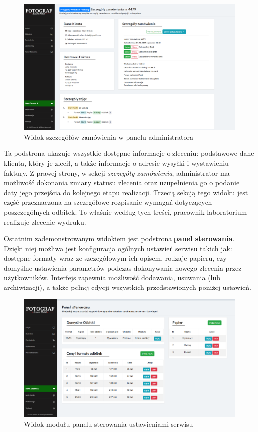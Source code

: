 \begin{figure}[ht]
	\centering
	\includegraphics[width=0.9\linewidth]{graphics/chapter-4/screen-6.png}
	\caption{Widok szczegółów zamówienia w panelu administratora}
	\label{fig:screen-6}
\end{figure}

\noindent Ta podstrona ukazuje wszystkie dostępne informacje o zleceniu: podstawowe dane klienta, który je zlecił, a także informacje o adresie wysyłki i wystawieniu faktury. Z prawej strony, w sekcji \textit{szczegóły zamówienia}, administrator ma możliwość dokonania zmiany statusu zlecenia oraz uzupełnienia go o podanie daty jego przejścia do kolejnego etapu realizacji. Trzecią sekcją tego widoku jest część przeznaczona na szczegółowe rozpisanie wymagań dotyczących poszczególnych odbitek. To właśnie według tych treści, pracownik laboratorium realizuje zlecenie wydruku.

\noindent Ostatnim zademonstrowanym widokiem jest podstrona \textbf{panel sterowania}. Dzięki niej możliwa jest konfiguracja ogólnych ustawień serwisu takich jak: dostępne formaty wraz ze szczegółowym ich opisem, rodzaje papieru, czy domyślne ustawienia parametrów podczas dokonywania nowego zlecenia przez użytkowników. Interfejs zapewnia możliwość dodawania, usuwania (lub archiwizacji), a także pełnej edycji wszystkich przedstawionych poniżej ustawień.

\begin{figure}[ht]
	\centering
	\includegraphics[width=0.9\linewidth]{graphics/chapter-4/screen-7.png}
	\caption{Widok modułu panelu sterowania ustawieniami serwisu}
	\label{fig:screen-7}
\end{figure}

